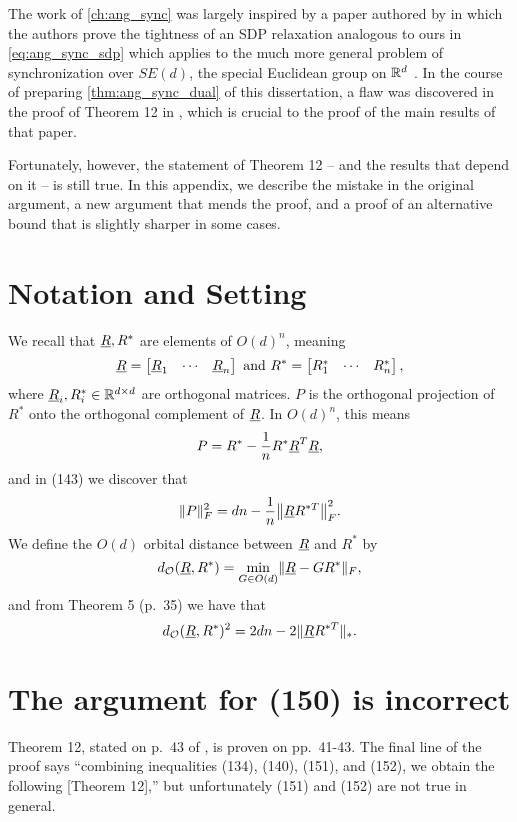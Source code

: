 The work of \cref{ch:ang_sync} was largely inspired by a paper authored by \citeauthor*{bandeira2016se_sync} in which the authors prove the tightness of an SDP relaxation analogous to ours in \eqref{eq:ang_sync_sdp} which applies to the much more general problem of synchronization over $SE(d)$, the special Euclidean group on $\mathbb{R}^d$ \cite{bandeira2016se_sync}.  In the course of preparing \cref{thm:ang_sync_dual} of this dissertation, a flaw was discovered in the proof of Theorem 12 in \cite{bandeira2016se_sync}, which is crucial to the proof of the main results of that paper.

Fortunately, however, the statement of Theorem 12 -- and the results that depend on it -- is still true.  In this appendix, we describe the mistake in the original argument, a new argument that mends the proof, and a proof of an alternative bound that is slightly sharper in some cases.

\section{Notation and Setting}
\label{sec:se_sync_notation}

We recall that $\underline{R}, R^*$ are elements of $O(d)^n$, meaning \[\underline{R} = \begin{bmatrix} \underline{R}_1 & \cdots & \underline{R}_n \end{bmatrix} \ \text{and} \ R^* = \begin{bmatrix} R^*_1 & \cdots & R^*_n \end{bmatrix},\] where $\underline{R}_i, R^*_i \in \mathbb{R}^{d \times d}$ are orthogonal matrices.  $P$ is the orthogonal projection of $R^*$ onto the orthogonal complement of $\underline{R}$.  In $O(d)^n$, this means \[P = R^* - \frac{1}{n} R^* \underline{R}^T \underline{R},\] and in (143) we discover that \[\norm{P}_F^2 = dn - \frac{1}{n} \norm*{\uR R^{*T}}_F^2.\]  We define the $O(d)$ orbital distance between $\underline{R}$ and $R^*$ by \[d_{\mathcal{O}}(\underline{R}, R^*) = \min_{G \in O(d)} \lVert\underline{R} - G R^*\rVert_F,\] and from Theorem 5 (p.~35) we have that \[d_{\mathcal{O}}(\underline{R}, R^*)^2 = 2 d n - 2 \lVert\underline{R} R^{*T}\rVert_*.\]

\section{The argument for (150) is incorrect}
\label{sec:incorrect}
Theorem 12, stated on p.~43 of \cite{bandeira2016se_sync}, is proven on pp.~41-43.  The final line of the proof says ``combining inequalities (134), (140), (151), and (152), we obtain the following [Theorem 12],'' but unfortunately (151) and (152) are not true in general.

